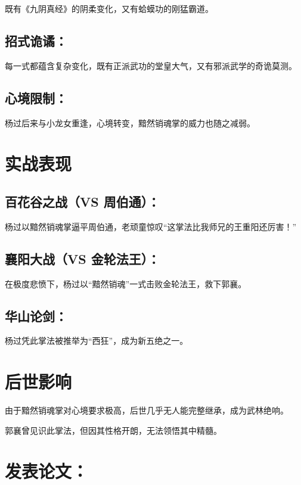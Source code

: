 \documentclass[doctor, vlined]{DissertUESTC}
\begin{document}
	既有《九阴真经》的阴柔变化，又有蛤蟆功的刚猛霸道。

	\subsection{招式诡谲：}

	每一式都蕴含复杂变化，既有正派武功的堂皇大气，又有邪派武学的奇诡莫测。

	\subsection{心境限制：}

	杨过后来与小龙女重逢，心境转变，黯然销魂掌的威力也随之减弱。

	\section{实战表现}

	\subsection{百花谷之战（VS 周伯通）：}

	杨过以黯然销魂掌逼平周伯通，老顽童惊叹“这掌法比我师兄的王重阳还厉害！”

	\subsection{襄阳大战（VS 金轮法王）：}

	在极度悲愤下，杨过以“黯然销魂”一式击败金轮法王，救下郭襄。

	\subsection{华山论剑：}

	杨过凭此掌法被推举为“西狂”，成为新五绝之一。

	\section{后世影响}

	由于黯然销魂掌对心境要求极高，后世几乎无人能完整继承，成为武林绝响。

	郭襄曾见识此掌法，但因其性格开朗，无法领悟其中精髓。
	
	\achievement %
	
	\section*{发表论文：}
	
\end{document}

